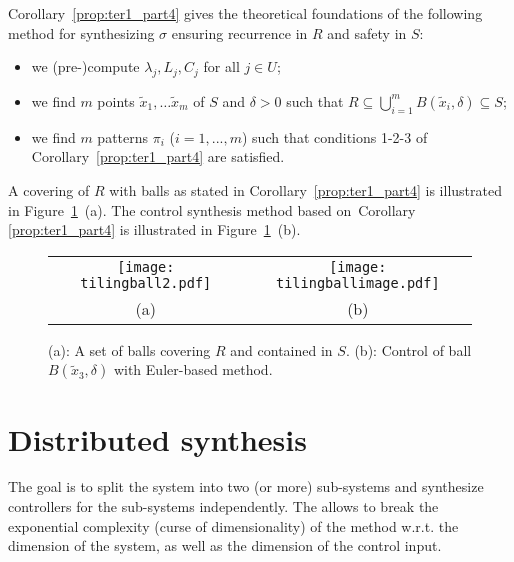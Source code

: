 Corollary~\ref{prop:ter1_part4} gives the theoretical foundations of the
following method for synthesizing $\sigma$ ensuring recurrence in $R$
and safety in $S$:
\begin{itemize}
\item we (pre-)compute $\lambda_j, L_j, C_j$ for all $j\in U$;
\item we find $m$ points $\tilde{x}_1,\dots\tilde{x}_m$ of $S$ and
  $\delta>0$ such that $R\subseteq \bigcup_{i=1}^m
  B(\tilde{x}_i,\delta)\subseteq S$;
\item we find $m$ patterns $\pi_i$ ($i=1,...,m$) such that conditions
  1-2-3 of Corollary~\ref{prop:ter1_part4} are satisfied.
\end{itemize}
%
A covering of $R$ with balls as stated in Corollary~\ref{prop:ter1_part4} is
illustrated in Figure~\ref{fig:post_part4}~(a).  The control synthesis
method based on~Corollary \ref{prop:ter1_part4} is illustrated in
Figure~\ref{fig:post_part4}~(b).




 \begin{figure}[t]
 \centering
\begin{tabular}{cc}
\texttt{[image: tilingball2.pdf]}
&
 \texttt{[image: tilingballimage.pdf]}
 \\
 (a) & (b)
\end{tabular}
\caption{(a): A set of balls covering $R$ and contained in $S$. (b): Control of ball $B(\tilde x_3,\delta)$ with Euler-based method.}
\label{fig:post_part4}
\end{figure}








\section{Distributed synthesis}\label{sec:distributed}

The goal is to split the system into two (or more) sub-systems and
synthesize controllers for the sub-systems independently. The allows
to break the exponential complexity (curse of dimensionality) of the
method w.r.t. the dimension of the system, as well as the dimension of
the control input.

